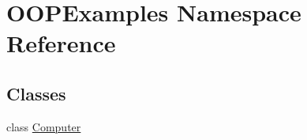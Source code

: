 \hypertarget{namespace_o_o_p_examples}{}\section{O\+O\+P\+Examples Namespace Reference}
\label{namespace_o_o_p_examples}
\subsection*{Classes}
\begin{DoxyCompactItemize}
\item 
class \mbox{\hyperlink{class_o_o_p_examples_1_1_computer}{Computer}}
\end{DoxyCompactItemize}
